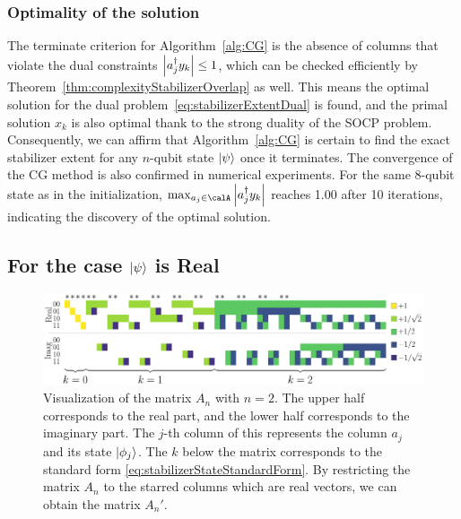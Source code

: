 \documentclass[a4paper, onecolumn, 11pt, longbibliography]{quantumarticle}
\begin{document}
\subsubsection{Optimality of the solution}

The terminate criterion for Algorithm~\ref{alg:CG}
is the absence of columns that violate
the dual constraints $\abs{a_j^\dagger y_k} \leq 1$,
which can be checked efficiently
by Theorem~\ref{thm:complexityStabilizerOverlap} as well.
This means the optimal solution for the
dual problem~\eqref{eq:stabilizerExtentDual}
is found, and the primal solution $x_k$ is also optimal
thank to the strong duality of the SOCP problem.
Consequently, we can affirm that
Algorithm~\ref{alg:CG} is certain to
find the exact stabilizer extent
for any $n$-qubit state $\ket{\psi}$
once it terminates.
The convergence of the CG method
is also confirmed in numerical experiments.
For the same 8-qubit state as in the initialization,
$\max_{a_j \in \calA} \abs{a_j^\dagger y_k}$
reaches 1.00 after 10 iterations,
indicating the discovery of the optimal solution.

\subsection{For the case $\ket{\psi}$ is Real}
\label{sec:restrictedRealProblem}

\begin{figure}[htbp]
  \centering
  \includegraphics[width=\columnwidth]{imgs/Amat.pdf}
  \caption{
    Visualization of the matrix $A_n$ with $n=2$.
    The upper half corresponds to the real part,
    and the lower half corresponds to the imaginary part.
    The $j$-th column of this represents
    the column $a_j$ and its state $\ket{\phi_j}$.
    The $k$ below the matrix
    corresponds to
    the standard form \eqref{eq:stabilizerStateStandardForm}.
    By restricting the matrix $A_n$
    to the starred columns
    which are real vectors,
    we can obtain the matrix $A_n'$.
  }
  \label{fig:Amat}
\end{figure}
\end{document}

